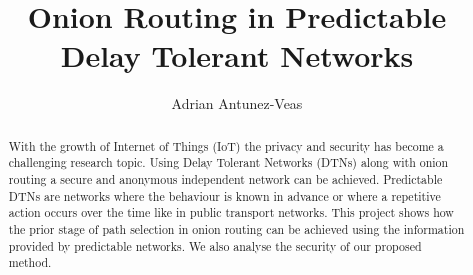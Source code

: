 \documentclass[runningheads,a4paper]{llncs}
\begin{document}


\title{Onion Routing in Predictable Delay Tolerant Networks}

\author{Adrian Antunez-Veas}

%
\iffalse
\author{Firstname Lastname\inst{1} \and Firstname Lastname\inst{2} }

\institute{
Insitute 1\\
\email{...}\and
Insitute 2\\
\email{...}
}
\fi
			
\maketitle

\begin{abstract}
With the growth of Internet of Things (IoT) the privacy and security has become a challenging research topic. Using Delay Tolerant Networks (DTNs) along with onion routing a secure and anonymous independent network can be achieved. Predictable DTNs are networks where the behaviour is known in advance or where a repetitive action occurs over the time like in public transport networks. This project shows how the prior stage of path selection in onion routing can be achieved using the information provided by predictable networks. We also analyse the security of our proposed method.
\end{abstract}





\end{document}
